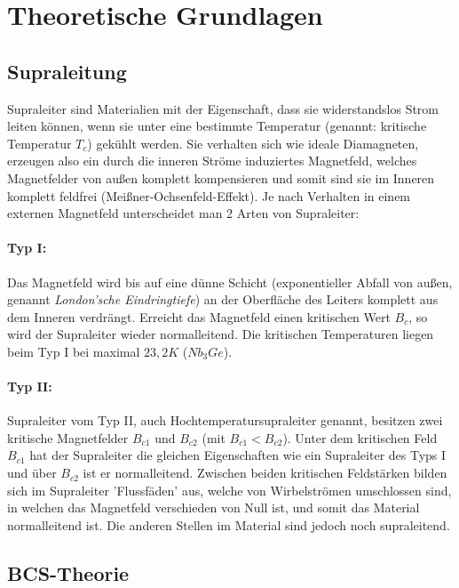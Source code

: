 \section{Theoretische Grundlagen}

\subsection{Supraleitung}

Supraleiter sind Materialien mit der Eigenschaft, dass sie widerstandslos Strom leiten können, wenn sie unter eine bestimmte Temperatur (genannt: kritische Temperatur $T_c$) gekühlt werden. Sie verhalten sich wie ideale Diamagneten, erzeugen also ein durch die inneren Ströme induziertes Magnetfeld, welches Magnetfelder von außen komplett kompensieren und somit sind sie im Inneren komplett feldfrei (Meißner-Ochsenfeld-Effekt). Je nach Verhalten in einem externen Magnetfeld unterscheidet man 2 Arten von Supraleiter:

\paragraph{Typ I: }  Das Magnetfeld wird bis auf eine dünne Schicht (exponentieller Abfall von außen, genannt \emph{London'sche Eindringtiefe}) an der Oberfläche des Leiters komplett aus dem Inneren verdrängt. Erreicht das Magnetfeld einen kritischen Wert $B_c$, so wird der Supraleiter wieder normalleitend. Die kritischen Temperaturen liegen beim Typ I bei maximal $23,2K$ ($Nb_3Ge$).

\paragraph{Typ II: } Supraleiter vom Typ II, auch Hochtemperatursupraleiter genannt, besitzen zwei kritische Magnetfelder $B_{c1}$ und $B_{c2}$ (mit $B_{c1} < B_{c2}$). Unter dem kritischen Feld $B_{c1}$ hat der Supraleiter die gleichen Eigenschaften wie ein Supraleiter des Typs I und über $B_{c2}$ ist er normalleitend. Zwischen beiden kritischen Feldstärken bilden sich im Supraleiter 'Flussfäden' aus, welche von Wirbelströmen umschlossen sind, in welchen das Magnetfeld verschieden von Null ist, und somit das Material normalleitend ist. Die anderen Stellen im Material sind jedoch noch supraleitend.

\subsection{BCS-Theorie}

